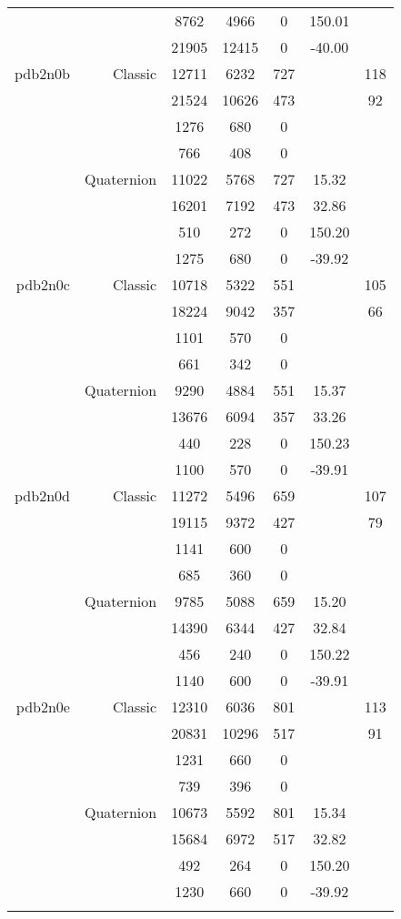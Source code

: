 \begin{xltabular}{\textwidth}{r|rcccSc}
& & 8762 & 4966 & 0 & 150.01 & \\
& & 21905 & 12415 & 0 & -40.00 & \\ \addlinespace
pdb2n0b & Classic & 12711 & 6232 & 727 & & 118 \\
& & 21524 & 10626 & 473 & & 92 \\
& & 1276 & 680 & 0 & & \\
& & 766 & 408 & 0 & & \\
& Quaternion & 11022 & 5768 & 727 & 15.32 & \\
& & 16201 & 7192 & 473 & 32.86 & \\
& & 510 & 272 & 0 & 150.20 & \\
& & 1275 & 680 & 0 & -39.92 & \\ \addlinespace
pdb2n0c & Classic & 10718 & 5322 & 551 & & 105 \\
& & 18224 & 9042 & 357 & & 66 \\
& & 1101 & 570 & 0 & & \\
& & 661 & 342 & 0 & & \\
& Quaternion & 9290 & 4884 & 551 & 15.37 & \\
& & 13676 & 6094 & 357 & 33.26 & \\
& & 440 & 228 & 0 & 150.23 & \\
& & 1100 & 570 & 0 & -39.91 & \\ \addlinespace
pdb2n0d & Classic & 11272 & 5496 & 659 & & 107 \\
& & 19115 & 9372 & 427 & & 79 \\
& & 1141 & 600 & 0 & & \\
& & 685 & 360 & 0 & & \\
& Quaternion & 9785 & 5088 & 659 & 15.20 & \\
& & 14390 & 6344 & 427 & 32.84 & \\
& & 456 & 240 & 0 & 150.22 & \\
& & 1140 & 600 & 0 & -39.91 & \\ \addlinespace
pdb2n0e & Classic & 12310 & 6036 & 801 & & 113 \\
& & 20831 & 10296 & 517 & & 91 \\
& & 1231 & 660 & 0 & & \\
& & 739 & 396 & 0 & & \\
& Quaternion & 10673 & 5592 & 801 & 15.34 & \\
& & 15684 & 6972 & 517 & 32.82 & \\
& & 492 & 264 & 0 & 150.20 & \\
& & 1230 & 660 & 0 & -39.92 & \\ \addlinespace

\end{xltabular}
